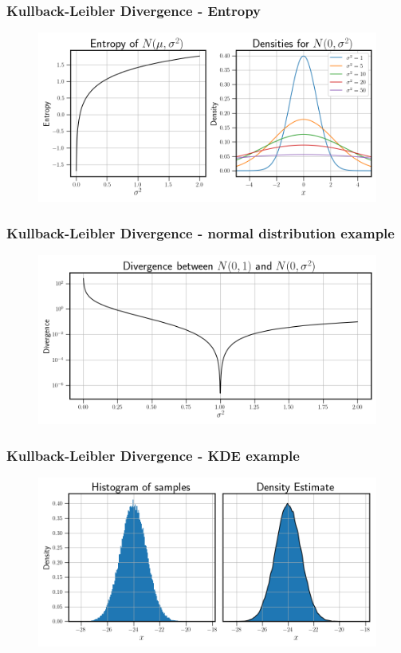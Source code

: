 \documentclass[11pt,aspectratio=169]{beamer}
\begin{document}
    \begin{frame}
        \frametitle{Kullback-Leibler Divergence - Entropy}
        \begin{figure}
            \centering
            \includegraphics[width=\textwidth]{../Figures/entropy_densities_example.png}
        \end{figure}
    \end{frame}

    \begin{frame}
        \frametitle{Kullback-Leibler Divergence - normal distribution example}
        \begin{figure}
            \centering
            \includegraphics[width=\textwidth]{../Figures/divergence_example.png}
        \end{figure}
    \end{frame}

    \begin{frame}
        \frametitle{Kullback-Leibler Divergence - KDE example}
        \begin{figure}
            \centering
            \includegraphics[width=\textwidth]{../Figures/kde_example.png}
        \end{figure}
    \end{frame}
\end{document}
